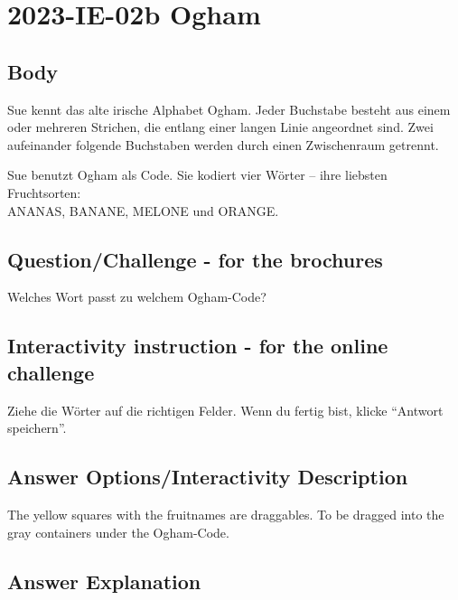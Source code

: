 \documentclass[a4paper,11pt]{report}
\newcommand{\taskGraphicsFolder}{..}
\begin{document}
\section*{\centering{} 2023-IE-02b Ogham}


\subsection*{Body}

Sue kennt das alte irische Alphabet Ogham.
Jeder Buchstabe besteht aus einem oder mehreren Strichen, die entlang einer langen Linie angeordnet sind.
Zwei aufeinander folgende Buchstaben werden durch einen Zwischenraum getrennt.

Sue benutzt Ogham als Code.  Sie kodiert vier Wörter – ihre liebsten Fruchtsorten: \\
ANANAS, BANANE, MELONE und ORANGE.

{\em


\subsection*{Question/Challenge - for the brochures}

Welches Wort passt zu welchem Ogham-Code?

{\centering%
\par}

}


\subsection*{Interactivity instruction - for the online challenge}

Ziehe die Wörter auf die richtigen Felder. Wenn du fertig bist, klicke \enquote{Antwort speichern}.

\begingroup
\renewcommand{\arraystretch}{1.5}
\subsection*{Answer Options/Interactivity Description}

The yellow squares with the fruitnames are draggables. To be dragged into the gray containers under the Ogham-Code.

\endgroup

\subsection*{Answer Explanation}
\end{document}
